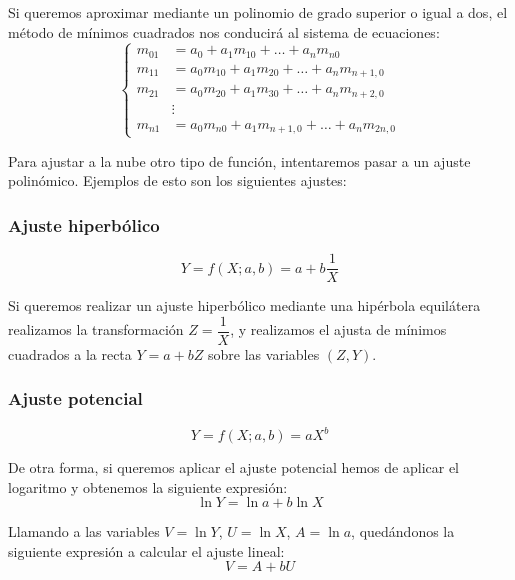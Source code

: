 Si queremos aproximar mediante un polinomio de grado superior o igual a dos, el método
de mínimos cuadrados nos conducirá al sistema de ecuaciones:
\begin{equation*}
    \left\{
    \begin{array}{cl}
        m_{01} &= a_0 + a_1 m_{10} + \ldots + a_n m_{n0}\\
        m_{11} &= a_0m_{10} + a_1 m_{20} + \ldots + a_n m_{n+1,0}\\
        m_{21} &= a_0m_{20} + a_1 m_{30} + \ldots + a_n m_{n+2,0}\\
        &\vdots\\
        m_{n1} &= a_0 m_{n0} + a_1 m_{n+1,0} + \ldots + a_n m_{2n,0}
    \end{array}
    \right.
\end{equation*}



Para ajustar a la nube otro tipo de función, intentaremos pasar a un ajuste polinómico. Ejemplos de esto son los siguientes ajustes:

\subsubsection{Ajuste hiperbólico}\vspace{-0.5cm}
\begin{equation*}
    Y=f(X;a,b) = a+b\frac{1}{X}
\end{equation*}


Si queremos realizar un ajuste hiperbólico mediante una hipérbola equilátera realizamos la transformación $Z = \dfrac{1}{X}$, y realizamos el ajusta de mínimos cuadrados a la recta $Y = a + bZ$ sobre
las variables $(Z,Y)$.

\subsubsection{Ajuste potencial}\vspace{-0.5cm}
\begin{equation*}
    Y=f(X;a,b) = aX^b
\end{equation*}

De otra forma, si queremos aplicar el ajuste potencial hemos de aplicar el logaritmo y obtenemos la siguiente expresión:
$$\ln Y = \ln a + b \ln X$$

Llamando a las variables $V = \ln Y$, $U = \ln X$, $A = \ln a$, quedándonos la siguiente expresión a calcular el ajuste lineal: $$V= A + bU$$

